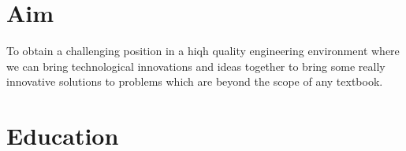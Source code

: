 \documentclass[11pt,a4paper,sans]{moderncv}        %
\begin{document}
\vspace*{-1.05mm}
\makecvtitle
\vspace*{-10mm}

\section{Aim}
To obtain a challenging position in a hiqh quality engineering environment where we can bring technological innovations and ideas together to bring some really innovative solutions to problems which are beyond the scope of any textbook.


\section{Education}




    


\end{document}
